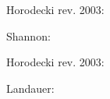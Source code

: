 \documentclass[12pt]{article}
\begin{document}
Horodecki rev. 2003: \cite{Horodecki2003PRA_NoisyOps}

Shannon: \cite{Shannon1948BSTJ}

Horodecki rev. 2003: \cite{horodecki_reversible_2003}

Landauer: \cite{Landauer1961_5392446Erasure}




\end{document}
